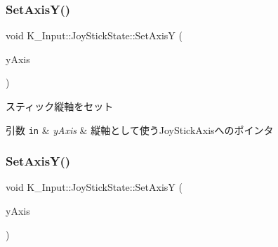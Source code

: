 \subsubsection{\texorpdfstring{Set\+Axis\+Y()}{SetAxisY()}\hspace{0.1cm}{\footnotesize\ttfamily [1/2]}}
{\footnotesize\ttfamily void K\+\_\+\+Input\+::\+Joy\+Stick\+State\+::\+Set\+AxisY (\begin{DoxyParamCaption}\item[{\mbox{\hyperlink{struct_k___input_1_1_joy_stick_axis}{Joy\+Stick\+Axis}} $\ast$}]{y\+Axis }\end{DoxyParamCaption})\hspace{0.3cm}{\ttfamily [inline]}}



スティック縦軸をセット 


\begin{DoxyParams}[1]{引数}
\mbox{\tt in}  & {\em y\+Axis} & 縦軸として使う\+Joy\+Stick\+Axisへのポインタ \\
\hline
\end{DoxyParams}
\mbox{\label{struct_k___input_1_1_joy_stick_state_a6dbdfeb0bf0f40a1176160a24f19e4b3}} 
\subsubsection{\texorpdfstring{Set\+Axis\+Y()}{SetAxisY()}\hspace{0.1cm}{\footnotesize\ttfamily [2/2]}}
{\footnotesize\ttfamily void K\+\_\+\+Input\+::\+Joy\+Stick\+State\+::\+Set\+AxisY (\begin{DoxyParamCaption}\item[{\mbox{\hyperlink{struct_k___input_1_1_joy_stick_axis}{Joy\+Stick\+Axis}} $\ast$}]{y\+Axis }\end{DoxyParamCaption})\hspace{0.3cm}{\ttfamily [inline]}}

